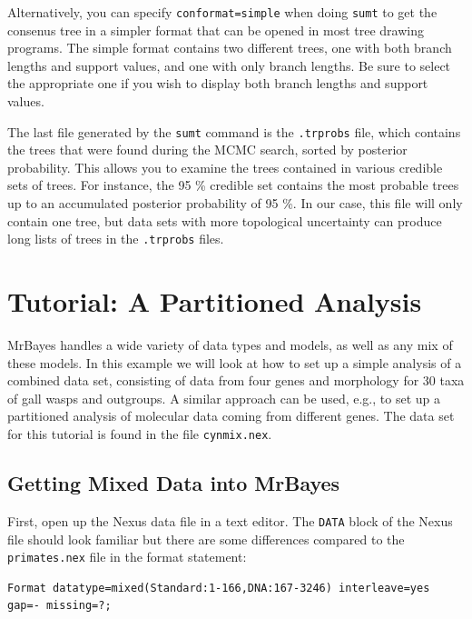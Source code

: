 \documentclass[12pt]{book}
\newcommand{\ttt}[1]{\texttt{#1}}
\begin{document}
Alternatively, you can specify \ttt{conformat=simple} when doing \ttt{sumt} to get the consenus
tree in a simpler format that can be opened in most tree drawing programs. The simple format
contains two different trees, one with both branch lengths and support values, and one with only
branch lengths. Be sure to select the appropriate one if you wish to display both branch lengths
and support values.

The last file generated by the \ttt{sumt} command is the \ttt{.trprobs} file, which contains the
trees that were found during the MCMC search, sorted by posterior probability. This allows you to
examine the trees contained in various credible sets of trees. For instance, the 95 \% credible set
contains the most probable trees up to an accumulated posterior probability of 95 \%. In our case,
this file will only contain one tree, but data sets with more topological uncertainty can produce
long lists of trees in the \ttt{.trprobs} files.

\chapter{Tutorial: A Partitioned Analysis}
\label{tutorialPartitioned}
MrBayes handles a wide variety of data types and models, as well as any mix of these models. In
this example we will look at how to set up a simple analysis of a combined data set, consisting of
data from four genes and morphology for 30 taxa of gall wasps and outgroups. A similar approach can
be used, e.g., to set up a partitioned analysis of molecular data coming from different genes. The
data set for this tutorial is found in the file \texttt{cynmix.nex}. 

\section{Getting Mixed Data into MrBayes}

First, open up the Nexus data file in a text editor. The \texttt{DATA} block of the Nexus file should
look familiar but there are some differences compared to the \texttt{primates.nex} file in the format
statement:

\begin{singlespacing}\footnotesize
\begin{verbatim}
Format datatype=mixed(Standard:1-166,DNA:167-3246) interleave=yes gap=- missing=?;
\end{verbatim}
\normalsize
\end{singlespacing}
\end{document}

